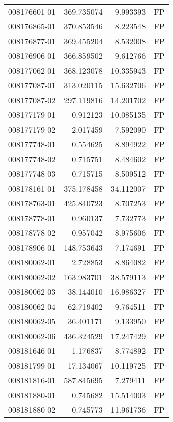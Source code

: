 \begin{tabular}{lrrl}
008176601-01 &  369.735074 &       9.993393 &   FP \\
008176865-01 &  370.853546 &       8.223548 &   FP \\
008176877-01 &  369.455204 &       8.532008 &   FP \\
008176906-01 &  366.859502 &       9.612766 &   FP \\
008177062-01 &  368.123078 &      10.335943 &   FP \\
008177087-01 &  313.020115 &      15.632706 &   FP \\
008177087-02 &  297.119816 &      14.201702 &   FP \\
008177179-01 &    0.912123 &      10.085135 &   FP \\
008177179-02 &    2.017459 &       7.592090 &   FP \\
008177748-01 &    0.554625 &       8.894922 &   FP \\
008177748-02 &    0.715751 &       8.484602 &   FP \\
008177748-03 &    0.715715 &       8.509512 &   FP \\
008178161-01 &  375.178458 &      34.112007 &   FP \\
008178763-01 &  425.840723 &       8.707253 &   FP \\
008178778-01 &    0.960137 &       7.732773 &   FP \\
008178778-02 &    0.957042 &       8.975606 &   FP \\
008178906-01 &  148.753643 &       7.174691 &   FP \\
008180062-01 &    2.728853 &       8.864082 &   FP \\
008180062-02 &  163.983701 &      38.579113 &   FP \\
008180062-03 &   38.144010 &      16.986327 &   FP \\
008180062-04 &   62.719402 &       9.764511 &   FP \\
008180062-05 &   36.401171 &       9.133950 &   FP \\
008180062-06 &  436.324529 &      17.247429 &   FP \\
008181646-01 &    1.176837 &       8.774892 &   FP \\
008181799-01 &   17.134067 &      10.119725 &   FP \\
008181816-01 &  587.845695 &       7.279411 &   FP \\
008181880-01 &    0.745682 &      15.514003 &   FP \\
008181880-02 &    0.745773 &      11.961736 &   FP \\

\end{tabular}
